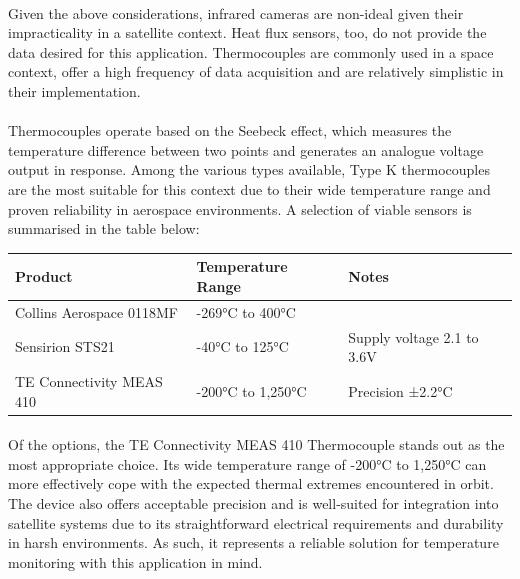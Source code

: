 \documentclass[11pt]{article}
\begin{document}
	\paragraph{}Given the above considerations, infrared cameras are non-ideal given their impracticality in a satellite context. Heat flux sensors, too, do not provide the data desired for this application. Thermocouples are commonly used in a space context, offer a high frequency of data acquisition and are relatively simplistic in their implementation.
	
	\paragraph{}Thermocouples operate based on the Seebeck effect, which measures the temperature difference between two points and generates an analogue voltage output in response. Among the various types available, Type K thermocouples are the most suitable for this context due to their wide temperature range and proven reliability in aerospace environments. A selection of viable sensors is summarised in the table below:
	
	\begin{center}
		\begin{tabular}{|p{4cm}|p{5cm}|p{5cm}|}
			\hline
			\bf{Product} & \bf{Temperature Range} & \bf{Notes} \\ \hline
			Collins Aerospace 0118MF &  -269°C to 400°C & \\ \hline
			Sensirion STS21 & -40°C to 125°C & Supply voltage 2.1 to 3.6V\\ \hline
			TE Connectivity MEAS 410 & -200°C to 1,250°C & Precision ±2.2°C\\ \hline
		\end{tabular}
	\end{center}
	
	\paragraph{}Of the options, the TE Connectivity MEAS 410 Thermocouple stands out as the most appropriate choice. Its wide temperature range of -200°C to 1,250°C can more effectively cope with the expected thermal extremes encountered in orbit. The device also offers acceptable precision and is well-suited for integration into satellite systems due to its straightforward electrical requirements and durability in harsh environments. As such, it represents a reliable solution for temperature monitoring with this application in mind.
	
\end{document}
